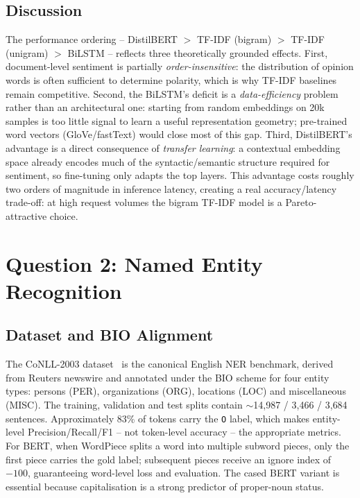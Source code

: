 \documentclass[11pt,a4paper]{article}
\begin{document}
\subsection{Discussion}
The performance ordering -- DistilBERT $>$ TF-IDF (bigram) $>$ TF-IDF (unigram) $>$ BiLSTM -- reflects three theoretically grounded effects. First, document-level sentiment is partially \emph{order-insensitive}: the distribution of opinion words is often sufficient to determine polarity, which is why TF-IDF baselines remain competitive. Second, the BiLSTM's deficit is a \emph{data-efficiency} problem rather than an architectural one: starting from random embeddings on 20k samples is too little signal to learn a useful representation geometry; pre-trained word vectors (GloVe/fastText) would close most of this gap. Third, DistilBERT's advantage is a direct consequence of \emph{transfer learning}: a contextual embedding space already encodes much of the syntactic/semantic structure required for sentiment, so fine-tuning only adapts the top layers. This advantage costs roughly two orders of magnitude in inference latency, creating a real accuracy/latency trade-off: at high request volumes the bigram TF-IDF model is a Pareto-attractive choice.

\section{Question 2: Named Entity Recognition}

\subsection{Dataset and BIO Alignment}
The CoNLL-2003 dataset~\cite{tjong2003introduction} is the canonical English NER benchmark, derived from Reuters newswire and annotated under the BIO scheme for four entity types: persons (PER), organizations (ORG), locations (LOC) and miscellaneous (MISC). The training, validation and test splits contain $\sim$14{,}987 / 3{,}466 / 3{,}684 sentences. Approximately 83\% of tokens carry the \texttt{O} label, which makes entity-level Precision/Recall/F1 -- not token-level accuracy -- the appropriate metrics. For BERT, when WordPiece splits a word into multiple subword pieces, only the first piece carries the gold label; subsequent pieces receive an ignore index of $-100$, guaranteeing word-level loss and evaluation. The cased BERT variant is essential because capitalisation is a strong predictor of proper-noun status.
\end{document}
